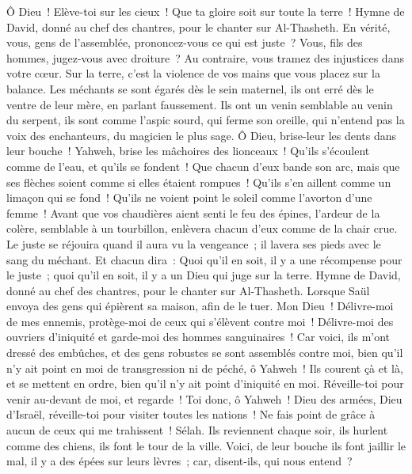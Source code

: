 \begin{multicols}{2}
Ô Dieu~! Elève-toi sur les cieux~! Que ta gloire soit sur toute la terre~!
\VerseOne{}Hymne de David, donné au chef des chantres, pour le chanter sur Al-Thasheth.
En vérité, vous, gens de l'assemblée, prononcez-vous ce qui est juste~? Vous, fils des hommes, jugez-vous avec droiture~?
Au contraire, vous tramez des injustices dans votre cœur. Sur la terre, c'est la violence de vos mains que vous placez sur la balance.
Les méchants se sont égarés dès le sein maternel, ils ont erré dès le ventre de leur mère, en parlant faussement.
Ils ont un venin semblable au venin du serpent, ils sont comme l'aspic sourd, qui ferme son oreille,
qui n'entend pas la voix des enchanteurs, du magicien le plus sage.
Ô Dieu, brise-leur les dents dans leur bouche~! Yahweh, brise les mâchoires des lionceaux~!
Qu'ils s'écoulent comme de l'eau, et qu'ils se fondent~! Que chacun d'eux bande son arc, mais que ses flèches soient comme si elles étaient rompues~!
Qu'ils s'en aillent comme un limaçon qui se fond~! Qu'ils ne voient point le soleil comme l'avorton d'une femme~!
Avant que vos chaudières aient senti le feu des épines, l'ardeur de la colère, semblable à un tourbillon, enlèvera chacun d'eux comme de la chair crue.
Le juste se réjouira quand il aura vu la vengeance~; il lavera ses pieds avec le sang du méchant.
Et chacun dira~: Quoi qu'il en soit, il y a une récompense pour le juste~; quoi qu'il en soit, il y a un Dieu qui juge sur la terre.
\VerseOne{}Hymne de David, donné au chef des chantres, pour le chanter sur Al-Thasheth. Lorsque Saül envoya des gens qui épièrent sa maison, afin de le tuer.
Mon Dieu~! Délivre-moi de mes ennemis, protège-moi de ceux qui s'élèvent contre moi~!
Délivre-moi des ouvriers d'iniquité et garde-moi des hommes sanguinaires~!
Car voici, ils m'ont dressé des embûches, et des gens robustes se sont assemblés contre moi, bien qu'il n'y ait point en moi de transgression ni de péché, ô Yahweh~!
Ils courent çà et là, et se mettent en ordre, bien qu'il n'y ait point d'iniquité en moi. Réveille-toi pour venir au-devant de moi, et regarde~!
Toi donc, ô Yahweh~! Dieu des armées, Dieu d'Israël, réveille-toi pour visiter toutes les nations~! Ne fais point de grâce à aucun de ceux qui me trahissent~! Sélah.
Ils reviennent chaque soir, ils hurlent comme des chiens, ils font le tour de la ville.
Voici, de leur bouche ils font jaillir le mal, il y a des épées sur leurs lèvres~; car, disent-ils, qui nous entend~?

\end{multicols}

